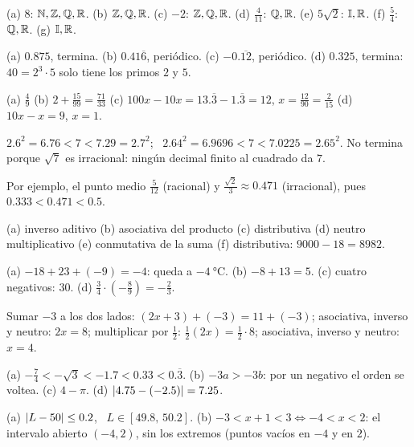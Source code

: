 \documentclass[11pt,a4paper]{article}
\newcommand{\per}[1]{\overline{#1}}
\begin{document}
\respuestas
\begin{respuestascortas}
\begin{soluciones}
\item (a) $8$: $\mathbb{N},\mathbb{Z},\mathbb{Q},\mathbb{R}$. (b) $\mathbb{Z},\mathbb{Q},\mathbb{R}$. (c) $-2$: $\mathbb{Z},\mathbb{Q},\mathbb{R}$. (d) $\tfrac{4}{11}$: $\mathbb{Q},\mathbb{R}$. (e) $5\sqrt2$: $\mathbb{I},\mathbb{R}$.
      (f) $\tfrac54$: $\mathbb{Q},\mathbb{R}$. (g) $\mathbb{I},\mathbb{R}$.
\item (a) $0.875$, termina. (b) $0.41\per6$, periódico. (c) $-0.\per{12}$, periódico. (d) $0.325$, termina: $40=2^3\cdot5$
      solo tiene los primos $2$ y $5$.
\item (a) $\tfrac49$ (b) $2+\tfrac{15}{99}=\tfrac{71}{33}$ (c) $100x-10x=13.\per3-1.\per3=12$, $x=\tfrac{12}{90}=\tfrac{2}{15}$
      (d) $10x-x=9$, $x=1$.
\item $2.6^2=6.76<7<7.29=2.7^2$; \ $2.64^2=6.9696<7<7.0225=2.65^2$. No termina porque $\sqrt7$ es irracional: ningún
      decimal finito al cuadrado da $7$.
\item Por ejemplo, el punto medio $\tfrac{5}{12}$ (racional) y $\tfrac{\sqrt2}{3}\approx0.471$ (irracional), pues
      $0.333<0.471<0.5$.
\item (a) inverso aditivo (b) asociativa del producto (c) distributiva (d) neutro multiplicativo (e) conmutativa de la suma
      (f) distributiva: $9000-18=8982$.
\item (a) $-18+23+(-9)=-4$: queda a $\SI{-4}{\celsius}$. (b) $-8+13=5$. (c) cuatro negativos: $30$.
      (d) $\tfrac34\cdot\left(-\tfrac89\right)=-\tfrac23$.
\item Sumar $-3$ a los dos lados: $(2x+3)+(-3)=11+(-3)$; asociativa, inverso y neutro: $2x=8$; multiplicar por $\tfrac12$:
      $\tfrac12(2x)=\tfrac12\cdot8$; asociativa, inverso y neutro: $x=4$.
\item (a) $-\tfrac74<-\sqrt3<-1.7<0.33<0.\per3$. (b) $-3a>-3b$: por un negativo el orden se voltea. (c) $4-\pi$.
      (d) $\left\lvert 4.75-(-2.5)\right\rvert=7.25$.
\item (a) $\left\lvert L-50\right\rvert\le0.2$, \ $L\in[49.8,\,50.2]$. (b) $-3<x+1<3\iff-4<x<2$: el intervalo abierto $(-4,2)$, sin los
      extremos (puntos vacíos en $-4$ y en $2$).
\end{soluciones}
\end{respuestascortas}
\end{document}
